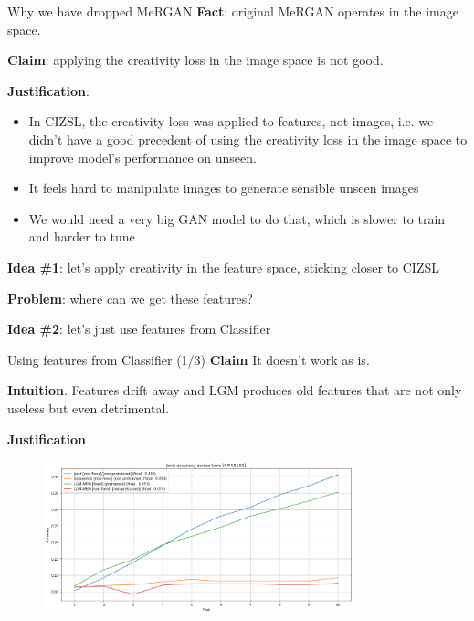 \documentclass[10pt]{beamer}
\begin{document}
\begin{frame}{Why we have dropped MeRGAN}
    \pause
    \textbf{Fact}: original MeRGAN operates in the image space.
    
    \pause
    \textbf{Claim}: applying the creativity loss in the image space is not good.
    
    \pause
    \textbf{Justification}:
    \begin{itemize}
        \item In CIZSL, the creativity loss was applied to features, not images, i.e. we didn't have a good precedent of using the creativity loss in the image space to improve model's performance on unseen.
        \item It feels hard to manipulate images to generate sensible unseen images
        \item We would need a very big GAN model to do that, which is slower to train and harder to tune
    \end{itemize}
    
    \pause
    \textbf{Idea \#1}: let's apply creativity in the feature space, sticking closer to CIZSL
    
    \textbf{Problem}: where can we get these features?
    
    \pause
    \textbf{Idea \#2}: let's just use features from Classifier
\end{frame}

\begin{frame}{Using features from Classifier (1/3)}
    \pause
    \textbf{Claim} It doesn't work as is.
    
    \pause
    \textbf{Intuition}. Features drift away and LGM produces old features that are not only useless but even detrimental.
    
    \pause
    \textbf{Justification}
    \begin{figure}
        \centering
        \includegraphics[width=0.8\textwidth]{images/lgm-mem-non-fixed-embedder-is-bad.png}
    \end{figure}
\end{frame}
\end{document}
